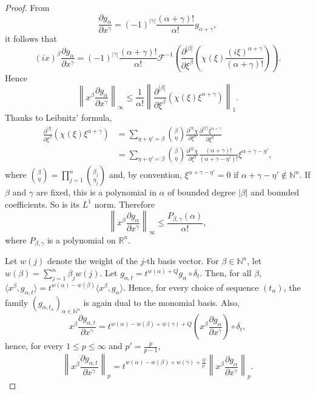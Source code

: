 \documentclass[11pt]{article}
\theoremstyle{definition}
\numberwithin{equation}{section}
\numberwithin{figure}{section}
\numberwithin{table}{section}
\newcommand{\R}{\mathbb{R}}
\newcommand{\N}{\mathbb{N}}
\newcommand*\Fi{\mathcal{F}^{-1}}
\begin{document}
\begin{proof}
From
\[
\frac{\partial g_{\alpha}}{\partial x^{\gamma}}=(-1)^{|\gamma|}\frac{(\alpha+\gamma)!}{\alpha!} g_{\alpha+\gamma},
\]
it follows that
\[
(ix)^\beta \frac{\partial g_{\alpha}}{\partial x^{\gamma}} = (-1)^{|\gamma|}\frac{(\alpha+\gamma)!}{\alpha!}\Fi \left(\frac{\partial^{|\beta|}}{\partial \xi^\beta} \left(\chi(\xi)\frac{(i\xi)^{\alpha+\gamma}}{(\alpha+\gamma)!}\right) \right).
\]
Hence
\[
\left\|x^\beta \frac{\partial g_{\alpha}}{\partial x^{\gamma}}
\right\|_{\infty}\leq \frac{1}{\alpha!} \left\|\frac{\partial^{|\beta|}}{\partial
\xi^\beta} (\chi(\xi)\xi^{\alpha+\gamma})\right\|_1.
\]
Thanks to Leibnitz' formula,
\begin{align*}
\frac{\partial^{|\beta|}}{\partial \xi^\beta} (\chi(\xi)
\xi^{\alpha+\gamma}) &=\sum_{\eta+\eta'=\beta}
\binom{\beta}{\eta}
\frac{\partial^{|\eta|}\chi}{\partial \xi^\eta}
\frac{\partial^{|\eta'|}\xi^{\alpha +\gamma}}{\partial \xi^{\eta'}}\\
&=\sum_{\eta+\eta'=\beta}
\binom{\beta}{\eta}
\frac{\partial^{|\eta|}\chi}{\partial \xi^\eta}
\frac{(\alpha+\gamma)!}{(\alpha+\gamma-\eta')!} \xi^{\alpha+\gamma-\eta'},
\end{align*}
where $\binom{\beta}{\eta}=\prod_{j=1}^n\binom{\beta_j}{\eta_j}$ and, by convention, $\xi^{\alpha+\gamma-\eta'}=0$ if $\alpha +\gamma -\eta'\notin\N^n$. If $\beta$ and $\gamma$ are fixed, this is a polynomial in $\alpha$ of bounded degree $|\beta|$ and bounded coefficients. So is its $L^1$ norm. Therefore
\[
\left\|x^\beta \frac{\partial g_{\alpha}}{\partial x^{\gamma}}\right\|_{\infty}\leq \frac{P_{\beta,\gamma}(\alpha)}{\alpha!},
\]
where $P_{\beta,\gamma}$ is a polynomial on $\R^n$.

Let $w(j)$ denote the weight of the $j$-th basis vector. For $\beta\in\N^n$, let $w(\beta)=\sum_{j=1}^n \beta_j w(j)$. Let $g_{\alpha,t}=t^{w(\alpha)+Q}g_\alpha\circ\delta_t$. Then, for all $\beta$, $\langle x^\beta,g_{\alpha,t}\rangle=t^{w(\alpha)-w(\beta)}\langle x^\beta,g_\alpha\rangle$. Hence, for every choice of sequence $(t_\alpha)$, the family $(g_{\alpha,t_\alpha})_{\alpha\in\N^n}$ is again dual to the monomial basis. Also,
\[
x^\beta \frac{\partial g_{\alpha,t}}{\partial x^{\gamma}} = t^{w(\alpha)-w(\beta)+w(\gamma)+Q} \left(x^\beta \frac{\partial g_{\alpha}}{\partial x^{\gamma}}\right) \circ \delta_t,
\]
hence, for every $1\leq p\leq \infty$ and $p'=\frac{p}{p-1}$,
\[
\left\|x^\beta \frac{\partial g_{\alpha,t}}{\partial x^{\gamma}}\right\|_{p} = t^{w(\alpha)-w(\beta)+w(\gamma)+\frac{Q}{p'}} \left\|x^\beta \frac{\partial g_{\alpha}}{\partial x^{\gamma}} \right\|_{p}.
\]


\end{proof}
\end{document}
